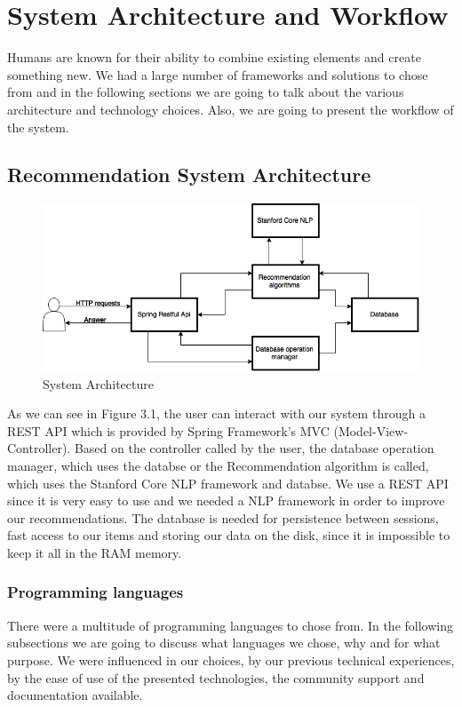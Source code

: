 \chapter{System Architecture and Workflow}
\label{chapter:system-architecture}
Humans are known for their ability to combine existing elements and create something new. We had a large number of frameworks and solutions to chose from and in the following sections we are going to talk about the various architecture and technology choices.
Also, we are going to present the workflow of the system.

\section{Recommendation System Architecture} 
\label{sec:architecture}

\begin{figure}[h]
\caption{System Architecture}
\includegraphics[width=1.0\textwidth]{src/img/architecture.png}
\end{figure}

As we can see in Figure 3.1, the user can interact with our system through a REST API which is provided by Spring Framework's MVC (Model-View-Controller). Based on the controller called by the user, the database operation manager, which uses the databse or the Recommendation algorithm is called, which uses the Stanford Core NLP framework and databse. We use a REST API since it is very easy to use and we needed a NLP framework in order to improve our recommendations. The database is needed for persistence between sessions, fast access to our items and storing our data on the disk, since it is impossible to keep it all in the RAM memory.

\subsection{Programming languages}
\label{sec:programming-languages}
There were a multitude of programming languages to chose from.
In the following subsections we are going to discuss what languages we chose, why and for what purpose.
We were influenced in our choices, by our previous technical experiences, by the ease of use of the presented technologies, the community support and documentation available.

